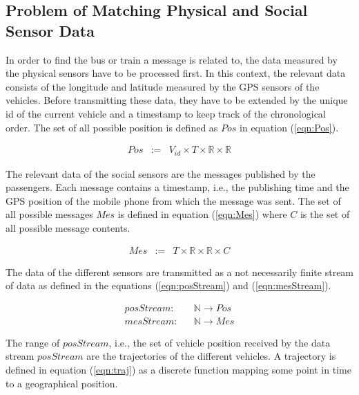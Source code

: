 \subsection{Problem of Matching Physical and Social Sensor Data}\label{sec:problem}

In order to find the bus or train a message is related to, the data measured by the physical sensors have to be processed first. In this context, the relevant data consists of the longitude and latitude measured by the GPS sensors of the vehicles. Before transmitting these data, they have to be extended by the unique id of the current vehicle and a timestamp to keep track of the chronological order. The set of all possible position is defined as $Pos$ in equation (\ref{eqn:Pos}).

\vspace*{-2\baselineskip}
\begin{eqnarray}
 Pos & := & V_{id} \times T \times \mathbb{R} \times \mathbb{R}\label{eqn:Pos}
\end{eqnarray}

The relevant data of the social sensors are the messages published by the passengers. Each message contains a timestamp, i.e., the publishing time and the GPS position of the mobile phone from which the message was sent. The set of all possible messages $Mes$ is defined in equation (\ref{eqn:Mes}) where $C$ is the set of all possible message contents.

\vspace*{-2\baselineskip}
\begin{eqnarray}
 Mes & := & T \times \mathbb{R} \times \mathbb{R} \times C\label{eqn:Mes}
\end{eqnarray}

The data of the different sensors are transmitted as a not necessarily finite stream of data as defined in the equations (\ref{eqn:posStream}) and (\ref{eqn:mesStream}).

\vspace*{-2\baselineskip}
\begin{eqnarray}
 posStream: &  & \mathbb{N} \rightarrow Pos\label{eqn:posStream}\\
 mesStream: &  & \mathbb{N} \rightarrow Mes\label{eqn:mesStream}
\end{eqnarray}

The range of $posStream$, i.e., the set of vehicle position received by the data stream $posStream$ are the trajectories of the different vehicles. A trajectory is defined in equation (\ref{eqn:traj}) as a discrete function mapping some point in time to a geographical position.

